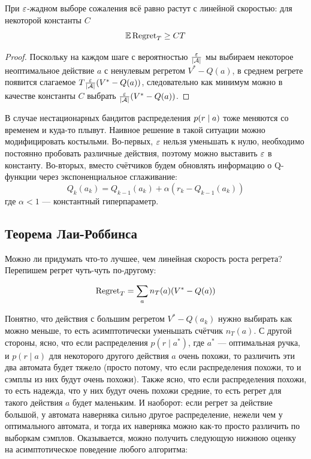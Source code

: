 \begin{proposition}
При $\varepsilon$-жадном выборе сожаления всё равно растут с линейной скоростью: для некоторой константы $C$
$$\mathbb{E} \operatorname{Regret}_T \ge CT$$
\begin{proof}
Поскольку на каждом шаге с вероятностью $\frac{\varepsilon}{|\mathcal{A}|}$ мы выбираем некоторое неоптимальное действие $a$ с ненулевым регретом $V^* - Q(a)$, в среднем регрете появится слагаемое $T \frac{\varepsilon}{|\mathcal{A}|} (V^* - Q(a))$, следовательно как минимум можно в качестве константы $C$ выбрать $\frac{\varepsilon}{|\mathcal{A}|} (V^* - Q(a))$.
\end{proof}
\end{proposition}

\begin{remark}
В случае нестационарных бандитов распределения $p(r \HM\mid a)$ тоже меняются со временем и куда-то плывут. Наивное решение в такой ситуации можно модифицировать костыльми. Во-первых, $\varepsilon$ нельзя уменьшать к нулю, необходимо постоянно пробовать различные действия, поэтому можно выставить $\varepsilon$ в константу. Во-вторых, вместо счётчиков будем обновлять информацию о Q-функции через экспоненциальное сглаживание:
$$Q_k(a_k) = Q_{k-1}(a_k) + \alpha \left( r_k - Q_{k-1}(a_k) \right)$$
где $\alpha < 1$ --- константный гиперпараметр.
\end{remark}

\subsection{Теорема Лаи-Роббинса}

Можно ли придумать что-то лучшее, чем линейная скорость роста регрета? Перепишем регрет чуть-чуть по-другому:

\begin{proposition}
\begin{equation}\label{regretalt}
\operatorname{Regret}_T = \sum_{a} n_T(a) (V^* - Q(a))
\end{equation}
\end{proposition}

Понятно, что действия с большим регретом $V^* - Q(a_k)$ нужно выбирать как можно меньше, то есть асимптотически уменьшать счётчик $n_T(a)$. С другой стороны, ясно, что если распределения $p(r \mid a^*)$, где $a^*$ --- оптимальная ручка, и $p(r \mid a)$ для некоторого другого действия $a$ очень похожи, то различить эти два автомата будет тяжело (просто потому, что если распределения похожи, то и сэмплы из них будут очень похожи). Также ясно, что если распределения похожи, то есть надежда, что у них будут очень похожи средние, то есть регрет для такого действия $a$ будет маленьким. И наоборот: если регрет за действие большой, у автомата наверняка сильно другое распределение, нежели чем у оптимального автомата, и тогда их наверняка можно как-то просто различить по выборкам сэмплов. Оказывается, можно получить следующую нижнюю оценку на асимптотическое поведение любого алгоритма:

